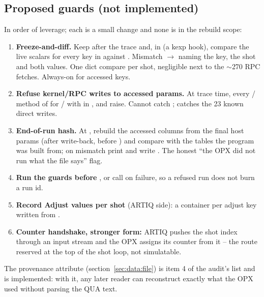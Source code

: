 \subsection{Proposed guards (not implemented)}
\label{sec:midloop:guards}

In order of leverage; each is a small change and none is in the rebuild
scope:

\begin{enumerate}[nosep]
  \item \textbf{Freeze-and-diff.} Keep  after the trace and, in
     (a kexp hook), compare the
    live scalars for every key in  against
    .
    Mismatch $\to$  naming the key, the shot and both
    values. One dict compare per shot, negligible next to the $\sim$270 RPC
    fetches. Always-on for accessed keys.
  \item \textbf{Refuse kernel/RPC writes to accessed params.} At trace time,
     every / method of
     for  / 
    with  in , and raise. Cannot catch
    ; catches the 23 known direct writes.
  \item \textbf{End-of-run hash.} At , rebuild the accessed
    columns from the final host params (after write-back, before
    ) and compare with the tables the program was built
    from; on mismatch print \code{***} and write
    . The honest ``the OPX did not run what
    the file says'' flag.
  \item \textbf{Run the guards before }, or call
     on failure, so a refused run does not burn a run id.
  \item \textbf{Record Adjust values per shot} (ARTIQ side): a container per
    adjust key written from .
  \item \textbf{Counter handshake, stronger form:} ARTIQ pushes the shot index
    through an input stream and the OPX assigns its counter from it -- the
    route reserved at the top of the shot loop, not simulatable.
\end{enumerate}

The  provenance attribute (section~\ref{sec:data:file})
is item 4 of the audit's list and is implemented: with it, any later reader
can reconstruct exactly what the OPX used without parsing the QUA text.
